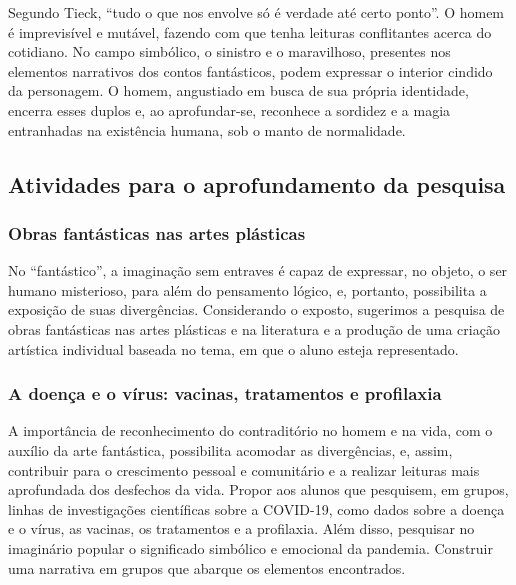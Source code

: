\documentclass[12pt]{extarticle}
\begin{document}
Segundo Tieck, ``tudo o que nos envolve só é verdade até certo ponto''.
O homem é imprevisível e mutável, fazendo com que tenha leituras
conflitantes acerca do cotidiano. No campo simbólico, o sinistro e o
maravilhoso, presentes nos elementos narrativos dos contos fantásticos,
podem expressar o interior cindido da personagem. O homem, angustiado em
busca de sua própria identidade, encerra esses duplos e, ao
aprofundar-se, reconhece a sordidez e a magia entranhadas na existência
humana, sob o manto de normalidade.

\subsection{Atividades para o aprofundamento da pesquisa}



\subsubsection{Obras fantásticas nas artes plásticas}

No ``fantástico'', a imaginação sem entraves é capaz de expressar, no
objeto, o ser humano misterioso, para além do pensamento lógico, e,
portanto, possibilita a exposição de suas divergências. Considerando o
exposto, sugerimos a pesquisa de obras fantásticas nas artes plásticas
e na literatura e a produção de uma criação artística individual
baseada no tema, em que o aluno esteja representado.

\subsubsection{A doença
e o vírus: vacinas, tratamentos e profilaxia}

A importância de reconhecimento do contraditório no homem e na vida,
com o auxílio da arte fantástica, possibilita acomodar as
divergências, e, assim, contribuir para o crescimento pessoal e
comunitário e a realizar leituras mais aprofundada dos desfechos da
vida. Propor aos alunos que pesquisem, em grupos, linhas de
investigações científicas sobre a COVID-19, como dados sobre a doença
e o vírus, as vacinas, os tratamentos e a profilaxia. Além disso,
pesquisar no imaginário popular o significado simbólico e emocional da
pandemia. Construir uma narrativa em grupos que abarque os elementos
encontrados.
\end{document}
